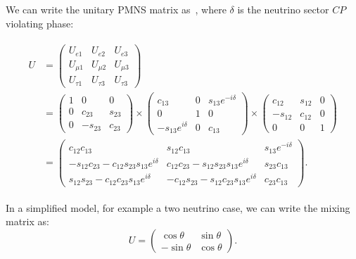\documentclass[aps,prd,twocolumn,nofootinbib]{revtex4-1}
\begin{document}
  We can write the unitary PMNS matrix as~\cite{matrixpara}, where $\delta$ is the neutrino sector $CP$ violating phase:
\begin{widetext}
  \begin{align}
    \begin{split}
      U & =
      \begin{pmatrix}
        U_{e1}    & U_{e2}    & U_{e3}   \\
        U_{\mu1}  & U_{\mu2}  & U_{\mu3} \\
        U_{\tau1} & U_{\tau3} & U_{\tau3}
      \end{pmatrix} \\
      \label{eq:umatrix}
      & = \begin{pmatrix}
        1 & 0 & 0 \\
        0 & c_{23} & s_{23} \\
        0 & -s_{23} & c_{23} \end{pmatrix} \times
      \begin{pmatrix}
        c_{13} & 0 & s_{13}e^{-i\delta} \\
        0      & 1 & 0 \\
        -s_{13}e^{i\delta} & 0 & c_{13} \end{pmatrix} \times
      \begin{pmatrix}
        c_{12} & s_{12} & 0 \\
        -s_{12} & c_{12} & 0 \\
        0 & 0 & 1
      \end{pmatrix} \\
      & = \begin{pmatrix}
        c_{12}c_{13} & s_{12}c_{13} & s_{13}e^{-i\delta} \\
        -s_{12}c_{23} - c_{12}s_{23}s_{13}e^{i\delta} & c_{12}c_{23} - s_{12}s_{23}s_{13}e^{i\delta} & s_{23}c_{13} \\
        s_{12}s_{23} - c_{12}c_{23}s_{13}e^{i\delta} & -c_{12}s_{23} - s_{12}c_{23}s_{13}e^{i\delta} & c_{23}c_{13}
      \end{pmatrix}.
    \end{split}
  \end{align}
\end{widetext}
In a simplified model, for example a two neutrino case, we can write the mixing matrix as:
\begin{equation}
  U = \begin{pmatrix}
    \cos\theta & \sin\theta \\
    -\sin\theta & \cos\theta
  \end{pmatrix}.
\end{equation}
\end{document}
